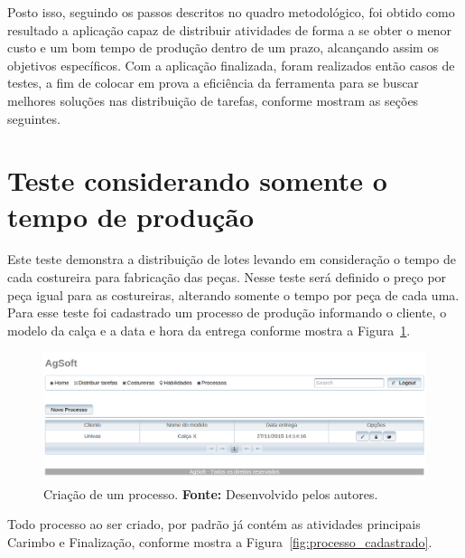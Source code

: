 \par Posto isso, seguindo os passos descritos no quadro metodológico, foi obtido como resultado a aplicação
capaz de distribuir atividades de forma a se obter o menor custo e um bom tempo de produção dentro de um prazo, 
alcançando assim os objetivos específicos. Com a aplicação finalizada, foram realizados então casos de 
testes, a fim de colocar em prova a eficiência da ferramenta para se buscar melhores soluções nas distribuição 
de tarefas, conforme mostram as seções seguintes.


\section{Teste considerando somente o tempo de produção}

\par Este teste demonstra a distribuição de lotes levando em consideração o
tempo de cada costureira para fabricação das peças. Nesse teste será definido o
preço por peça igual para as costureiras, alterando somente o tempo por peça de
cada uma. Para esse teste foi cadastrado um processo de produção informando o
cliente, o modelo da calça e a data e hora da entrega conforme mostra a Figura~\ref{fig:cad_processo1}.

\begin{figure}[h!]
	\centerline{\includegraphics[width=14.7cm]{./imagens/teste_processo.png}}
	\caption[Criação de um processo.]
	{Criação de um processo. \textbf{Fonte:} Desenvolvido pelos autores.}
	\label{fig:cad_processo1}
\end{figure}

\par Todo processo ao ser criado, por padrão já contém as atividades principais
 Carimbo e Finalização, conforme mostra a Figura~\ref{fig:processo_cadastrado}.


